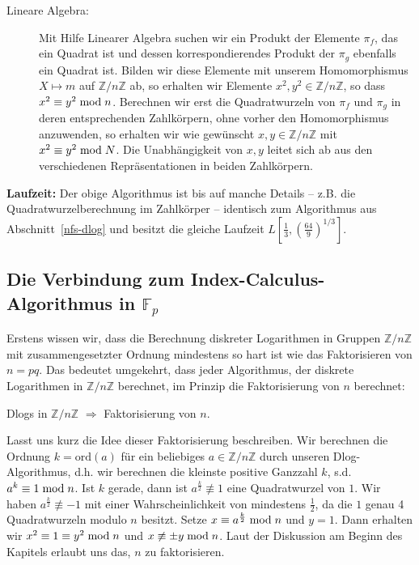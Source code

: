 \begin{refsegment}
\begin{description}
\item[Lineare Algebra:] Mit Hilfe Linearer Algebra suchen wir ein Produkt der Elemente $\pi_f$, das ein Quadrat ist und dessen korrespondierendes Produkt der $\pi_g$ ebenfalls ein Quadrat ist. Bilden wir diese Elemente mit unserem Homomorphismus $X \mapsto m$ auf $\mathbb{Z}/n\mathbb{Z}$ ab, so erhalten wir Elemente $x^2,y^2 \in \mathbb{Z}/n\mathbb{Z}$, so dass $x^2 \equiv y^2 \hspace{1mm}{\rm mod}\hspace{1mm} n$. Berechnen wir erst die Quadratwurzeln von $\pi_f$ und $\pi_g$ in deren entsprechenden Zahlkörpern, ohne vorher den Homomorphismus anzuwenden, so erhalten wir wie gewünscht $x, y \in \mathbb{Z}/n\mathbb{Z}$ mit $x^2 \equiv y^2 \hspace{1mm}{\rm mod}\hspace{1mm} N$. Die Unabhängigkeit von $x,y$ leitet sich ab aus den verschiedenen Repräsentationen in beiden Zahlkörpern.
\end{description}

\textbf{Laufzeit:}
Der obige Algorithmus ist bis auf manche Details -- z.B. die Quadratwurzelberechnung im Zahlkörper -- identisch zum Algorithmus aus Abschnitt~\ref{nfs-dlog} und besitzt die gleiche Laufzeit $L[\frac 1
3,\left(\frac{64}{9}\right)^{1/3}]$.


\subsection{\texorpdfstring{Die Verbindung zum Index-Calculus-Algorithmus in $\mathbb{F}_p$}{Die Verbindung zum Index-Calculus-Algorithmus in Fp}}

Erstens wissen wir, dass die Berechnung diskreter Logarithmen in Gruppen $\mathbb{Z}/n\mathbb{Z}$ mit zusammengesetzter Ordnung mindestens so hart ist wie das Faktorisieren von $n=pq$. Das bedeutet umgekehrt, dass jeder Algorithmus, der diskrete Logarithmen in $\mathbb{Z}/n\mathbb{Z}$ berechnet, im Prinzip die Faktorisierung von $n$ berechnet:
\begin{center}
  Dlogs in $\mathbb{Z}/n\mathbb{Z}$ $\Rightarrow$ Faktorisierung von $n$.
\end{center}

Lasst uns kurz die Idee dieser Faktorisierung beschreiben. Wir berechnen die Ordnung $k=\textrm{ord}(a)$ für ein beliebiges $a \in \mathbb{Z}/n\mathbb{Z}$ durch unseren Dlog-Algorithmus, d.h. wir berechnen die kleinste positive Ganzzahl $k$, s.d. $a^{k} \equiv 1 \hspace{1mm}{\rm mod}\hspace{1mm} n$. Ist $k$ gerade, dann ist $a^{\frac k 2} \not\equiv 1$ eine Quadratwurzel von $1$. Wir haben $a^{\frac k 2} \not\equiv -1$ mit einer Wahrscheinlichkeit von mindestens $\frac 1 2$, da die $1$ genau 4 Quadratwurzeln modulo $n$ besitzt. Setze $x \equiv a^{\frac k 2} \hspace{1mm}{\rm mod}\hspace{1mm} n$ und $y = 1$. Dann erhalten wir $x^2 \equiv 1 \equiv y^2 \hspace{1mm}{\rm mod}\hspace{1mm} n$ und $x \not \equiv \pm y \hspace{1mm}{\rm mod}\hspace{1mm} n$. Laut der Diskussion am Beginn des Kapitels erlaubt uns das, $n$ zu faktorisieren.\\[0.1cm]


\end{refsegment}
